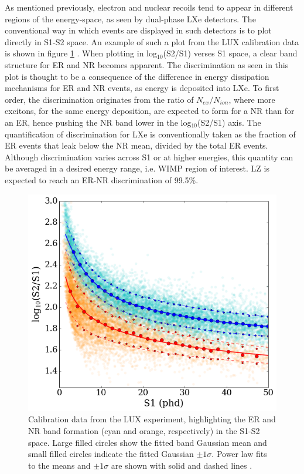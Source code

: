 As mentioned previously, electron and nuclear recoils tend to appear in different regions of the energy-space, as seen by dual-phase LXe detectors. The conventional way in which events are displayed in such detectors is to plot directly in S1-S2 space. An example of such a plot from the LUX calibration data is shown in figure \ref{fig:er_nr_discrimination} \cite{lux_signal_yields}. When plotting in log$_{10}$(S2/S1) verses S1 space, a clear band structure for ER and NR becomes apparent. The discrimination as seen in this plot is thought to be a consequence of the difference in energy dissipation mechanisms for ER and NR events, as energy is deposited into LXe. To first order, the discrimination originates from the ratio of $N_{ex}/N_{ion}$, where more excitons, for the same energy deposition, are expected to form for a NR than for an ER, hence pushing the NR band lower in the log$_{10}$(S2/S1) axis. The quantification of discrimination for LXe is conventionally taken as the fraction of ER events that leak below the NR mean, divided by the total ER events. Although discrimination varies across S1 or at higher energies, this quantity can be averaged in a desired energy range, i.e. WIMP region of interest. LZ is expected to reach an ER-NR discrimination of 99.5\%.
%
\begin{figure}[ht!]
    \begin{center}
        \includegraphics[scale=0.60]{Chapter_2/Figures/PAPER_logS2S1_ERNRBandData.png}
        \caption[Calibration data from the LUX experiment, highlighting the ER and NR band formations in the S1-S2 energy-space.]%
        {Calibration data from the LUX experiment, highlighting the ER and NR band formation (cyan and orange, respectively) in the S1-S2 space. Large filled circles show the fitted band Gaussian mean and small filled circles indicate the fitted Gaussian $\pm1\sigma$. Power law fits to the means and $\pm1\sigma$ are shown with solid and dashed lines \cite{lux_signal_yields}.}
        \label{fig:er_nr_discrimination}
    \end{center}
\end{figure}
%


